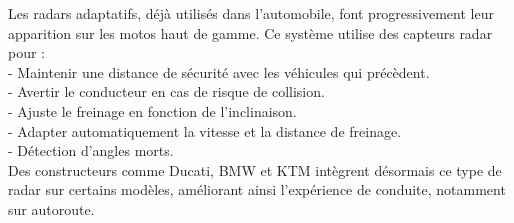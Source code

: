 Les radars adaptatifs, déjà utilisés dans l’automobile, font progressivement leur apparition sur les motos haut de gamme. Ce système utilise des capteurs radar pour :\\
- Maintenir une distance de sécurité avec les véhicules qui précèdent.\\
- Avertir le conducteur en cas de risque de collision.\\
- Ajuste le freinage en fonction de l'inclinaison.\\
- Adapter automatiquement la vitesse et la distance de freinage.\\
- Détection d'angles morts.\\
Des constructeurs comme Ducati, BMW et KTM intègrent désormais ce type de radar sur certains modèles, améliorant ainsi l’expérience de conduite, notamment sur autoroute.

